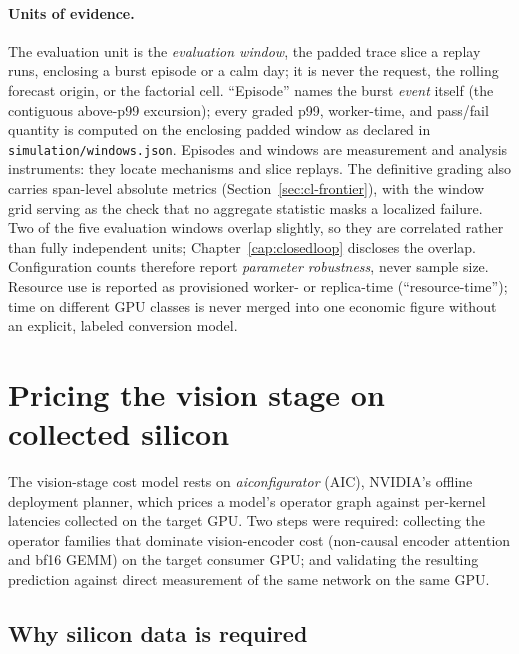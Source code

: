 \paragraph{Units of evidence.} The evaluation unit is the
\emph{evaluation window}, the padded trace slice a replay runs, enclosing
a burst episode or a calm day; it is never the request, the rolling forecast
origin, or the factorial cell. ``Episode'' names the burst \emph{event}
itself (the contiguous above-p99 excursion); every graded p99, worker-time,
and pass/fail quantity is computed on the enclosing padded window as declared
in \texttt{simulation/windows.json}. Episodes and windows are measurement
and analysis instruments: they locate mechanisms and slice replays. The
definitive grading also carries span-level absolute metrics
(Section~\ref{sec:cl-frontier}), with the window grid serving as the check
that no aggregate statistic masks a localized failure. Two of the five evaluation windows
overlap slightly, so they are correlated rather than fully independent units;
Chapter~\ref{cap:closedloop} discloses the overlap. Configuration counts therefore report
\emph{parameter robustness}, never sample size. Resource use is reported as
provisioned worker- or replica-time (``resource-time''); time on different
GPU classes is never merged into one economic figure without an explicit,
labeled conversion model.

\section{Pricing the vision stage on collected silicon}
\label{sec:aic-collection}

The vision-stage cost model rests on \textit{aiconfigurator} (AIC), NVIDIA's
offline deployment planner, which prices a model's operator graph against
per-kernel latencies collected on the target GPU. Two steps were required:
collecting the operator families that dominate vision-encoder cost
(non-causal encoder attention and bf16 GEMM) on the target consumer GPU; and
validating the resulting prediction against direct measurement of the same
network on the same GPU.

\subsection{Why silicon data is required}
\label{sec:aic-motivation}

